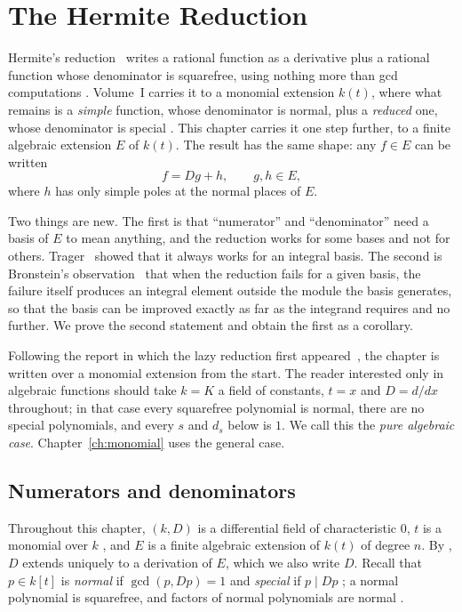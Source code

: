 \chapter{The Hermite Reduction}\label{ch:hermite}

Hermite's reduction~\cite{hermite1872} writes a rational function as a
derivative plus a rational function whose denominator is squarefree, using
nothing more than gcd computations . Volume~I carries it to a
monomial extension $k(t)$, where what remains is a \emph{simple} function,
whose denominator is normal, plus a \emph{reduced} one, whose denominator is
special . This chapter carries it
one step further, to a finite algebraic extension $E$ of $k(t)$. The result
has the same shape: any $f \in E$ can be written
\[
  f = Dg + h, \qquad g, h \in E,
\]
where $h$ has only simple poles at the normal places of $E$.

Two things are new. The first is that ``numerator'' and ``denominator'' need a
basis of $E$ to mean anything, and the reduction works for some bases and not
for others. Trager~\cite{trager1984} showed that it always works for an
integral basis. The second is Bronstein's observation~\cite{bronstein1998lazy}
that when the reduction fails for a given basis, the failure itself produces
an integral element outside the module the basis generates, so that the basis
can be improved exactly as far as the integrand requires and no further. We
prove the second statement and obtain the first as a corollary.

Following the report in which the lazy reduction first
appeared~\cite{bronstein1998lazy}, the chapter is written over a monomial
extension from the start. The reader interested only in algebraic functions
should take $k = K$ a field of constants, $t = x$ and $D = d/dx$ throughout; in
that case every squarefree polynomial is normal, there are no special
polynomials, and every $s$ and $d_s$ below is $1$. We call this the
\emph{pure algebraic case}. Chapter~\ref{ch:monomial} uses the general case.

\section{Numerators and denominators}\label{sec:hermite-numden}

Throughout this chapter, $(k, D)$ is a differential field of characteristic
$0$, $t$ is a monomial over $k$ , and $E$ is a finite
algebraic extension of $k(t)$ of degree $n$. By , $D$
extends uniquely to a derivation of $E$, which we also write $D$. Recall that
$p \in k[t]$ is \emph{normal} if $\gcd(p, Dp) = 1$ and \emph{special} if
$p \mid Dp$ ; a normal polynomial is squarefree, and
factors of normal polynomials are normal .

